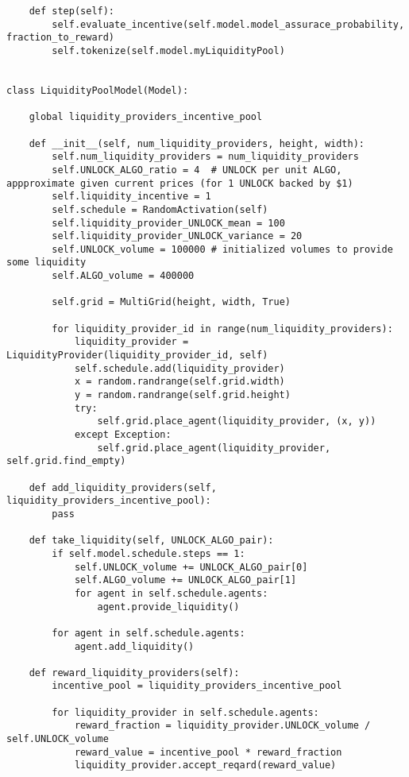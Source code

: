 \documentclass{article}
\begin{document}
\begin{lstlisting}
    def step(self):
        self.evaluate_incentive(self.model.model_assurace_probability, fraction_to_reward)
        self.tokenize(self.model.myLiquidityPool)


class LiquidityPoolModel(Model):

    global liquidity_providers_incentive_pool

    def __init__(self, num_liquidity_providers, height, width):
        self.num_liquidity_providers = num_liquidity_providers
        self.UNLOCK_ALGO_ratio = 4  # UNLOCK per unit ALGO, appproximate given current prices (for 1 UNLOCK backed by $1)
        self.liquidity_incentive = 1
        self.schedule = RandomActivation(self)
        self.liquidity_provider_UNLOCK_mean = 100
        self.liquidity_provider_UNLOCK_variance = 20
        self.UNLOCK_volume = 100000 # initialized volumes to provide some liquidity
        self.ALGO_volume = 400000

        self.grid = MultiGrid(height, width, True)

        for liquidity_provider_id in range(num_liquidity_providers):
            liquidity_provider = LiquidityProvider(liquidity_provider_id, self)
            self.schedule.add(liquidity_provider)
            x = random.randrange(self.grid.width)
            y = random.randrange(self.grid.height)
            try:
                self.grid.place_agent(liquidity_provider, (x, y))
            except Exception:
                self.grid.place_agent(liquidity_provider, self.grid.find_empty)

    def add_liquidity_providers(self, liquidity_providers_incentive_pool):
        pass

    def take_liquidity(self, UNLOCK_ALGO_pair):
        if self.model.schedule.steps == 1:        
            self.UNLOCK_volume += UNLOCK_ALGO_pair[0]
            self.ALGO_volume += UNLOCK_ALGO_pair[1]
            for agent in self.schedule.agents:
                agent.provide_liquidity()

        for agent in self.schedule.agents:
            agent.add_liquidity()

    def reward_liquidity_providers(self):
        incentive_pool = liquidity_providers_incentive_pool

        for liquidity_provider in self.schedule.agents:
            reward_fraction = liquidity_provider.UNLOCK_volume / self.UNLOCK_volume
            reward_value = incentive_pool * reward_fraction
            liquidity_provider.accept_reqard(reward_value)



\end{lstlisting}
\end{document}
